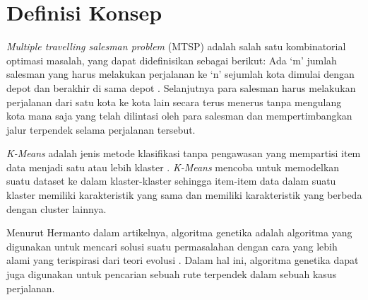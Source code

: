 \section{Definisi Konsep}

\textit{Multiple travelling salesman problem} (MTSP) adalah salah satu kombinatorial optimasi masalah, yang dapat didefinisikan sebagai berikut: Ada `m' jumlah salesman yang harus melakukan perjalanan ke `n' sejumlah kota dimulai dengan depot dan berakhir di sama depot \cite{al2019comparative}. Selanjutnya para salesman harus melakukan perjalanan dari satu kota ke kota lain secara terus menerus tanpa mengulang kota mana saja yang telah dilintasi oleh para salesman dan mempertimbangkan jalur terpendek selama perjalanan tersebut.

\textit{K-Means} adalah jenis metode klasifikasi tanpa pengawasan yang mempartisi item data menjadi satu atau lebih klaster \cite{agusta2007k}. \textit{K-Means} mencoba untuk memodelkan suatu dataset ke dalam klaster-klaster sehingga item-item data dalam suatu klaster memiliki karakteristik yang sama dan memiliki karakteristik yang berbeda dengan cluster lainnya.

Menurut Hermanto dalam artikelnya, algoritma genetika adalah algoritma yang digunakan untuk mencari solusi suatu permasalahan dengan cara yang lebih alami yang terispirasi dari teori evolusi  \cite{hermawanto2003algoritma}. Dalam hal ini, algoritma genetika dapat juga digunakan untuk pencarian sebuah rute terpendek dalam sebuah kasus perjalanan.
